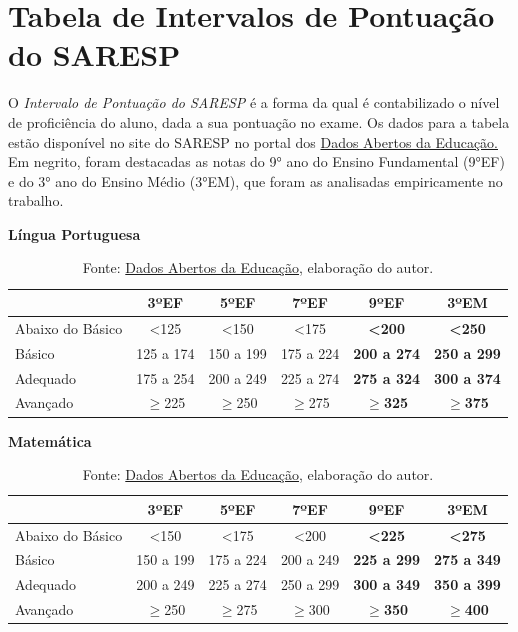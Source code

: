 \chapter{Tabela de Intervalos de Pontuação do SARESP} \label{ap:apendice1}

O \textit{Intervalo de Pontuação do SARESP} é a forma da qual é contabilizado o nível de proficiência do aluno, dada a sua pontuação no exame. Os dados para a tabela estão disponível no site do SARESP no portal dos \href{https://dados.educacao.sp.gov.br/story/saresp}{Dados Abertos da Educação.} Em negrito, foram destacadas as notas do 9° ano do Ensino Fundamental (9°EF) e do 3° ano do Ensino Médio (3°EM), que foram as analisadas empiricamente no trabalho.

\begin{table}[hbt!]
    \centering
    \caption{Intervalos de Pontuação}

    \renewcommand{\arraystretch}{1.4}

    \textbf{Língua Portuguesa}

    \begin{tabular}{lccccc}
        \hline
         & 3ºEF & 5ºEF & 7ºEF & \textbf{9ºEF} & \textbf{3ºEM} \\
        \hline
        Abaixo do Básico & <125 & <150 & <175 & \textbf{<200} & \textbf{<250} \\
        Básico           & 125 a 174 & 150 a 199 & 175 a 224 & \textbf{200 a 274} & \textbf{250 a 299} \\
        Adequado         & 175 a 254 & 200 a 249 & 225 a 274 & \textbf{275 a 324} & \textbf{300 a 374} \\
        Avançado         & $\geq$225 & $\geq$250 & $\geq$275 & \textbf{$\geq$325} & \textbf{$\geq$375} \\
        \hline
    \end{tabular}

    \vspace{0.8cm}

    \textbf{Matemática}

    \begin{tabular}{lccccc}
        \hline
         & 3ºEF & 5ºEF & 7ºEF & \textbf{9ºEF} & \textbf{3ºEM} \\
        \hline
        Abaixo do Básico & <150 & <175 & <200 & \textbf{<225} & \textbf{<275} \\
        Básico           & 150 a 199 & 175 a 224 & 200 a 249 & \textbf{225 a 299} & \textbf{275 a 349} \\
        Adequado         & 200 a 249 & 225 a 274 & 250 a 299 & \textbf{300 a 349} & \textbf{350 a 399} \\
        Avançado         & $\geq$250 & $\geq$275 & $\geq$300 & \textbf{$\geq$350} & \textbf{$\geq$400} \\
        \hline
    \end{tabular}

    \caption*{Fonte: \href{https://dados.educacao.sp.gov.br/story/saresp}{Dados Abertos da Educação}, elaboração do autor.}
    \label{tab:intervalos_saresp}
\end{table}